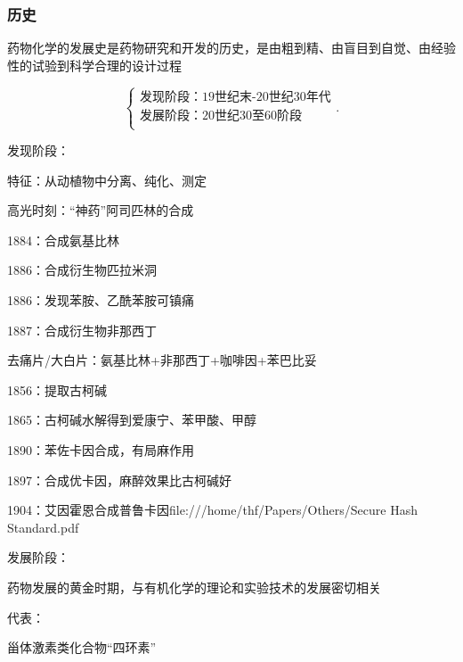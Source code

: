 \subsubsection{历史}%
\label{subsub:历史}
\begin{notation}
    药物化学的发展史是药物研究和开发的历史，是由粗到精、由盲目到自觉、由经验性的试验到科学合理的设计过程
\end{notation}
\[
    \begin{cases}
        \text{发现阶段：19世纪末-20世纪30年代}\\
        \text{发展阶段：20世纪30至60阶段}\\
        \text{}
    \end{cases}
.\] 
\begin{notation}
    发现阶段：

    特征：从动植物中分离、纯化、测定

    高光时刻：“神药”阿司匹林的合成

    1884：合成氨基比林

    1886：合成衍生物匹拉米洞

    1886：发现苯胺、乙酰苯胺可镇痛

    1887：合成衍生物非那西丁

    去痛片/大白片：氨基比林+非那西丁+咖啡因+苯巴比妥

    1856：提取古柯碱

    1865：古柯碱水解得到爱康宁、苯甲酸、甲醇

    1890：苯佐卡因合成，有局麻作用

    1897：合成优卡因，麻醉效果比古柯碱好

    1904：艾因霍恩合成普鲁卡因file:///home/thf/Papers/Others/Secure Hash Standard.pdf
\end{notation}
\begin{notation}
    发展阶段：

    药物发展的黄金时期，与有机化学的理论和实验技术的发展密切相关

    代表：
    
    甾体激素类化合物“四环素”
\end{notation}

